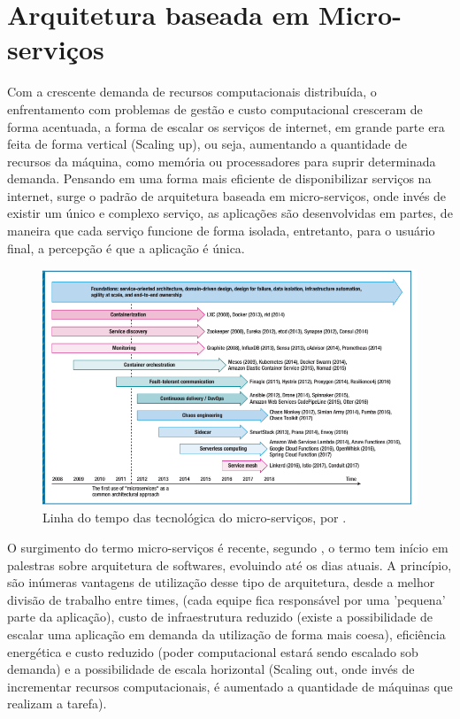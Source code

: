 
\chapter{\textbf{Arquitetura baseada em Micro-serviços}} %

Com a crescente demanda de recursos computacionais distribuída, o enfrentamento com problemas de gestão e custo computacional  cresceram de forma acentuada, a forma de escalar os serviços de internet, em grande parte era feita de forma vertical (Scaling up), ou seja, aumentando a quantidade de recursos da máquina, como memória ou processadores para suprir determinada demanda. Pensando em uma forma mais eficiente de disponibilizar serviços na internet, surge o padrão de arquitetura baseada em micro-serviços, onde invés de existir um único e complexo serviço, as aplicações são desenvolvidas em partes, de maneira que cada serviço funcione de forma isolada, entretanto, para o usuário final, a percepção é que a aplicação é única. 

\begin{figure}[h!]
	\includegraphics[width=\linewidth]{topics/timeline.png}
	\caption{Linha do tempo das tecnológica do micro-serviços, por \cite{8354433}.}
	\label{fig:timelinemicroservices}
\end{figure}


O surgimento do termo micro-serviços é recente, segundo \cite{8354433}, o termo tem início em palestras sobre arquitetura de softwares, evoluindo até os dias atuais. A princípio, são inúmeras vantagens de utilização desse tipo de arquitetura, desde a melhor divisão de trabalho entre times, (cada equipe fica responsável por uma 'pequena' parte da aplicação), custo de infraestrutura reduzido (existe a possibilidade de escalar uma aplicação em demanda da utilização de forma mais coesa), eficiência energética e custo reduzido (poder computacional estará sendo escalado sob  demanda) e a possibilidade de escala horizontal (Scaling out, onde invés de incrementar recursos computacionais, é aumentado a quantidade de máquinas que realizam a tarefa).
